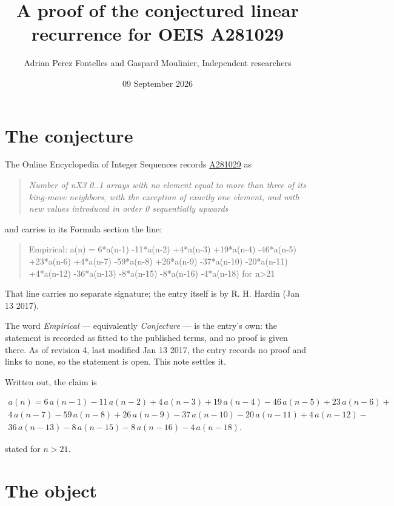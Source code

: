 \documentclass[11pt]{article}
\title{A proof of the conjectured linear recurrence for OEIS A281029}
\author{Adrian Perez Fontelles and Gaspard Moulinier, Independent researchers}
\date{09 September 2026}
\theoremstyle{definition}
\begin{document}
\maketitle
\section{The conjecture}

The Online Encyclopedia of Integer Sequences records \href{https://oeis.org/A281029}{A281029} as

\begin{quote}\itshape Number of nX3 0..1 arrays with no element equal to more than three of its king-move neighbors, with the exception of exactly one element, and with new values introduced in order 0 sequentially upwards\end{quote}

and carries in its Formula section the line:

\begin{quote}\ttfamily Empirical: a(n) = 6*a(n-1) -11*a(n-2) +4*a(n-3) +19*a(n-4) -46*a(n-5) +23*a(n-6) +4*a(n-7) -59*a(n-8) +26*a(n-9) -37*a(n-10) -20*a(n-11) +4*a(n-12) -36*a(n-13) -8*a(n-15) -8*a(n-16) -4*a(n-18) for n>21\end{quote}

That line carries no separate signature; the entry itself is by R. H. Hardin (Jan 13 2017).

The word {\itshape Empirical} --- equivalently {\itshape Conjecture} --- is the entry's own: the statement is recorded as fitted to the published terms, and no proof is given there. As of revision 4, last modified Jan 13 2017, the entry records no proof and links to none, so the statement is open. This note settles it.

Written out, the claim is

\begin{multline*} a(n) = 6\,a(n-1) - 11\,a(n-2) + 4\,a(n-3) + 19\,a(n-4) - 46\,a(n-5) + 23\,a(n-6) + \\ 4\,a(n-7) - 59\,a(n-8) + 26\,a(n-9) - 37\,a(n-10) - 20\,a(n-11) + 4\,a(n-12) - \\ 36\,a(n-13) - 8\,a(n-15) - 8\,a(n-16) - 4\,a(n-18). \end{multline*}

stated for $n > 21$.

\section{The object}
\end{document}
